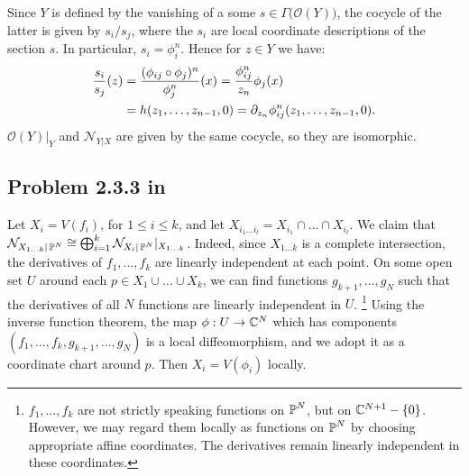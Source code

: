 \documentclass{article}
\begin{document}
Since $Y$ is defined by the vanishing of a some $s \in \Gamma\big(\mathcal{O}(Y)\big)$, the cocycle of the latter
is given by $s_i/s_j$, where the $s_i$ are local coordinate descriptions of the section $s$. In particular,
$s_i = \phi_i^n$. Hence for $z \in Y$ we have:
\begin{align*}
\frac{s_i}{s_j}(z) &= \frac{(\phi_{ij} \circ \phi_j)^n}{\phi_j^n}(x) = \frac{\phi_{ij}^n}{z_n} \phi_j(x) \\
&= h(z_1, \dots, z_{n-1}, 0) = \partial_{z_n} \phi_{ij}^n(z_1, \dots, z_{n-1}, 0).
\end{align*}
$\mathcal{O}(Y)|_Y$ and $\mathcal{N}_{Y|X}$ are given by the same cocycle, so they are isomorphic.



\subsection*{Problem 2.3.3 in \cite{Huy}}
Let $X_i = V(f_i)$, for $1\leq i \leq k$, and let $X_{i_1 \dots i_l} = X_{i_1} \cap \dots \cap X_{i_l}$. We
claim that $\mathcal{N}_{X_{1\dots k}|\operatorname{\mathbb{P}}^N} \cong \bigoplus_{i=1}^k \mathcal{N}_{X_i|\operatorname{\mathbb{P}}^N}|_{X_{1\dots k}}$.
Indeed, since $X_{1\dots k}$ is a complete intersection, the derivatives of $f_1, \dots, f_k$ are linearly
independent at each point. On some open set $U$ around each $p \in X_1 \cup \dots \cup X_k$, we can find functions 
$g_{k+1}, \dots, g_N$ such that the derivatives of all $N$ functions are linearly independent in $U$.
\footnote{$f_1, \dots, f_k$ are not strictly speaking functions on $\operatorname{\mathbb{P}}^N$, but on $\mathbb{C}^{N+1} - \{0\}$. However,
we may regard them locally as functions on $\operatorname{\mathbb{P}}^N$ by choosing appropriate affine coordinates. The derivatives
remain linearly independent in these coordinates.} Using the inverse function theorem, the map $\phi : U \to \mathbb{C}^N$
which has components $(f_1, \dots, f_k, g_{k+1}, \dots, g_N)$ is a local diffeomorphism, and we adopt it as a
coordinate chart around $p$. Then $X_i = V(\phi_i)$ locally.
\end{document}
